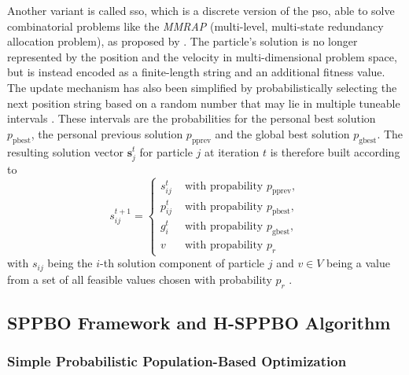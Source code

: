 Another variant is called \gls{sso}, which is a discrete version of the \gls{pso}, able to solve combinatorial problems like the \textit{MMRAP} (multi-level, multi-state redundancy allocation problem), as proposed by \citet{yeh2009two}. The particle's solution is no longer represented by the position and the velocity in multi-dimensional problem space, but is instead encoded as a finite-length string and an additional fitness value. The update mechanism has also been simplified by probabilistically selecting the next position string based on a random number that may lie in multiple tuneable intervals \cite{yeh2012simplified}. These intervals are the probabilities for the personal best solution $p_{\text{pbest}}$, the personal previous solution $p_{\text{pprev}} $ and the global best solution $p_{\text{gbest}}$. The resulting solution vector $\mathbf{s}^t_j$ for particle $j$ at iteration $t$ is therefore built according to
\begin{equation}
	\label{eq:sso_rule}
	s_{ij}^{t+1} = \begin{cases}
		s^t_{ij} & \text{ with propability } p_{\text{pprev}}, \\
		p^t_{ij} & \text{ with propability } p_{\text{pbest}}, \\
		g^t_{i} &\text{ with propability } p_{\text{gbest}}, \\
		v & \text{ with propability } p_{r}
	\end{cases}
\end{equation}
with $s_{ij}$ being the $i$-th solution component of particle $j$ and $v \in V$ being a value from a set of all feasible values chosen with probability $p_r$ \cite{lin2015simple}. 


\subsection{SPPBO Framework and H-SPPBO Algorithm}

\subsubsection{Simple Probabilistic Population-Based Optimization}

